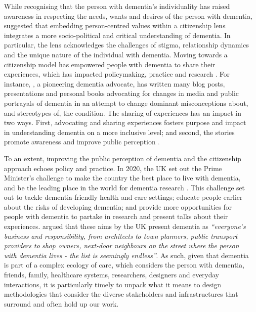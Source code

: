 While recognising that the person with dementia's individuality has raised awareness in respecting the needs, wants and desires of the person with dementia, \cite{bartlett_personhood_2007} suggested that embedding person-centred values within a citizenship lens integrates a more socio-political and critical understanding of dementia. In particular, the lens acknowledges the challenges of stigma, relationship dynamics and the unique nature of the individual with dementia. Moving towards a citizenship model has empowered people with dementia to share their experiences, which has impacted policymaking, practice and research \citep{weetch_involvement_2020}. For instance, \cite{bryden_challenging_2020}, a pioneering dementia advocate, has written many blog posts, presentations and personal books advocating for changes in media and public portrayals of dementia in an attempt to change dominant misconceptions about, and stereotypes of, the condition. The sharing of experiences has an impact in two ways. First, advocating and sharing experiences fosters purpose and impact in understanding dementia on a more inclusive level; and second, the stories promote awareness and improve public perception \citep{reynolds2017stigma}.

To an extent, improving the public perception of dementia and the citizenship approach echoes policy and practice. In 2020, the UK set out the Prime Minister’s challenge to make the country the best place to live with dementia, and be the leading place in the world for dementia research \citep{budgett2021designing}. This challenge set out to tackle dementia-friendly health and care settings; educate people earlier about the risks of developing dementia; and provide more opportunities for people with dementia to partake in research and present talks about their experiences. \cite{keady2017social} argued that these aims by the UK present dementia as \textit{``everyone’s business and responsibility, from architects to town planners, public transport providers to shop owners, next-door neighbours on the street where the person with dementia lives - the list is seemingly endless''}. As such, given that dementia is part of a complex ecology of care, which considers the person with dementia, friends, family, healthcare systems, researchers, designers and everyday interactions, it is particularly timely to unpack what it means to design methodologies that consider the diverse stakeholders and infrastructures that surround and often hold up our work. 

